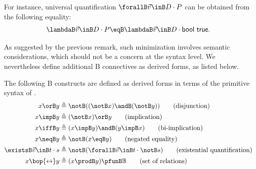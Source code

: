 \begin{example}
  For instance, universal quantification \( \forallB \vec{v} \inB D \cdot P \) can be obtained from the following equality:
  \[
    \lambdaB \vec{v} \inB D \cdot P \eqB \lambdaB \vec{v} \inB D \cdot \mathsf{bool}\ \mathsf{true}.
  \]
\end{example}

As suggested by the previous remark, such minimization involves semantic considerations, which should not be a concern at the syntax level.
We nevertheless define additional B connectives as derived forms, as listed below.

\begin{definition}
The following B constructs are defined as derived forms in terms of the primitive syntax of .
\begin{align*}
  x \orB y &\triangleq \notB((\notB x) \andB (\notB y)) \tag{disjunction} \\
  x \impB y &\triangleq (\notB x) \orB y \tag{implication} \\
  x \iffB y &\triangleq (x \impB y) \andB (y \impB x) \tag{bi-implication} \\
  x \neqB y &\triangleq \notB(x \eqB y) \tag{negated equality} \\
  \existsB \vec{v} \inB t \cdot s &\triangleq \notB(\forallB \vec{v} \inB t \cdot \notB s) \tag{existential quantification} \\
  x \bop{\leftrightarrow} y &\triangleq (x \prodB y) \pfunB \mathbb{B} \tag{set of relations}
\end{align*}
\end{definition}


\subsection{}
\label{subsec:b-monadically-encoded-syntax}


